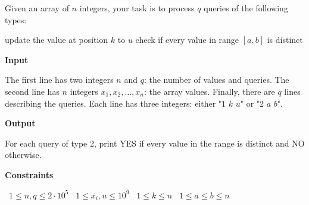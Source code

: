 Given an array of $n$ integers, your task is to process $q$ queries of the following types:

update the value at position $k$ to $u$
check if every value in range $[a, b]$ is distinct

\vspace{0.3cm}\noindent\textbf{Input}

The first line has two integers $n$ and $q$: the number of values and queries.
The second line has $n$ integers $x_1, x_2,\dots, x_n$: the array values.
Finally, there are $q$ lines describing the queries. Each line has three integers: either "$1$ $k$ $u$" or "$2$ $a$ $b$".

\vspace{0.3cm}\noindent\textbf{Output}

For each query of type 2, print YES if every value in the range is distinct and NO otherwise.

\vspace{0.3cm}\noindent\textbf{Constraints}

\textbullet\ $1 \le n, q \le 2 \cdot 10^5$
\textbullet\ $1 \le x_i, u \le 10^9$
\textbullet\ $1 \le k \le n$
\textbullet\ $1 \le a \le b \le n$